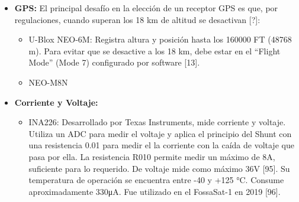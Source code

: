 \documentclass[12pt,a4paper]{article}
\begin{document}
\begin{itemize}
  \begin{itemize}
  \item
    BME280: Con un rango de presión especificado de entre 300 y 1100 hPa {[}9{]}, serviría si solo fuéramos a una altura máxima de 9 km aproximadamente.
  \item
    BMP388: Elaborado por Bosch Sensortec, es una evolución del anterior con mejor precisión, alcanzando valores del orden de ±0,5 hPa. A pesar de esta mejora, su rango de presión sigue comenzando en 300 hPa {[}10{]}.
  \item
    MS5607: Desarrollado por TE Connectivity, tiene un rango operativo de 10 a 1200 hPa con una precisión de ±1,5. También tiene un sensor de temperatura integrado con rango de −40 a +85 °C. Además, tiene una resolución de altura de 20 cm {[}11{]}.
  \item
    MS5611: También desarrollado por TE Connectivity, tiene un rango operativo de 10 a 1200 hPa con una precisión de ±1,5. También tiene un sensor de temperatura integrado con rango de −40 a +85 °C. Además, tiene una resolución de altura de 10 cm {[}12{]}.
  \end{itemize}
\item
  \textbf{GPS:} El principal desafío en la elección de un receptor GPS es que, por regulaciones, cuando superan los 18 km de altitud se desactivan {[}?{]}:

  \begin{itemize}
  \item
    U-Blox NEO-6M: Registra altura y posición hasta los 160000 FT (48768 m). Para evitar que se desactive a los 18 km, debe estar en el ``Flight Mode'' (Mode 7) configurado por software {[}13{]}.
  \item
    NEO-M8N
  \end{itemize}
\item
  \textbf{Corriente y Voltaje:}

  \begin{itemize}
  \item
    INA226: Desarrollado por Texas Instruments, mide corriente y voltaje. Utiliza un ADC para medir el voltaje y aplica el principio del Shunt con una resistencia 0.01 para medir el la corriente con la caída de voltaje que pasa por ella. La resistencia R010 permite medir un máximo de 8A, suficiente para lo requerido. De voltaje mide como máximo 36V {[}95{]}. Su temperatura de operación se encuentra entre -40 y +125 °C. Consume aproximadamente 330μA. Fue utilizado en el FossaSat-1 en 2019 {[}96{]}.
  \end{itemize}
\end{itemize}
\end{document}
